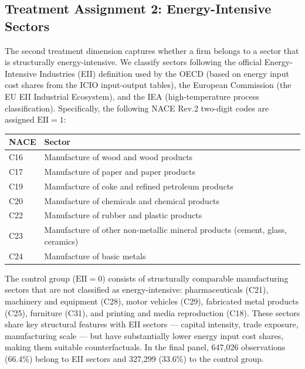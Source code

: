 \documentclass[12pt,a4paper]{article}
\begin{document}
\subsection{Treatment Assignment 2: Energy-Intensive Sectors}

The second treatment dimension captures whether a firm belongs to a sector that is structurally energy-intensive. We classify sectors following the official Energy-Intensive Industries (EII) definition used by the OECD (based on energy input cost shares from the ICIO input-output tables), the European Commission (the EU EII Industrial Ecosystem), and the IEA (high-temperature process classification). Specifically, the following NACE Rev.2 two-digit codes are assigned $\text{EII}=1$:

\begin{center}
\small
\begin{tabular}{ll}
\toprule
NACE & Sector \\
\midrule
C16 & Manufacture of wood and wood products \\
C17 & Manufacture of paper and paper products \\
C19 & Manufacture of coke and refined petroleum products \\
C20 & Manufacture of chemicals and chemical products \\
C22 & Manufacture of rubber and plastic products \\
C23 & Manufacture of other non-metallic mineral products (cement, glass, ceramics) \\
C24 & Manufacture of basic metals \\
\bottomrule
\end{tabular}
\end{center}

The control group ($\text{EII}=0$) consists of structurally comparable manufacturing sectors that are not classified as energy-intensive: pharmaceuticals (C21), machinery and equipment (C28), motor vehicles (C29), fabricated metal products (C25), furniture (C31), and printing and media reproduction (C18). These sectors share key structural features with EII sectors — capital intensity, trade exposure, manufacturing scale — but have substantially lower energy input cost shares, making them suitable counterfactuals. In the final panel, 647,026 observations (66.4\%) belong to EII sectors and 327,299 (33.6\%) to the control group.



\end{document}
